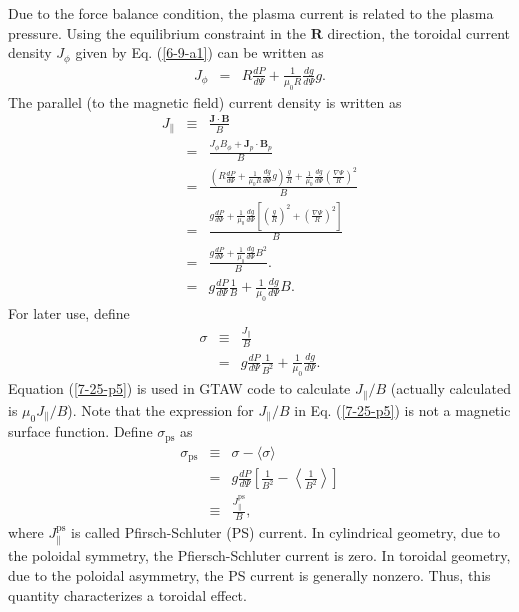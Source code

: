 \documentclass{llncs}
\newcommand{\tmop}[1]{\ensuremath{\operatorname{#1}}}
\begin{document}
Due to the force balance condition, the plasma current is related to the
plasma pressure. Using the equilibrium constraint in the $\mathbf{R}$
direction, the toroidal current density $J_{\phi}$ given by Eq. (\ref{6-9-a1})
can be written as
\begin{eqnarray}
  J_{\phi} & = & R \frac{d P}{d \Psi} + \frac{1}{\mu_0 R}  \frac{d g}{d \Psi}
  g.  \label{4-10-1}
\end{eqnarray}
The parallel (to the magnetic field) current density is written as
\begin{eqnarray}
  J_{\parallel} & \equiv & \frac{\mathbf{J} \cdot \mathbf{B}}{B} \nonumber\\
  & = & \frac{J_{\phi} B_{\phi} +\mathbf{J}_p \cdot \mathbf{B}_p}{B}
  \nonumber\\
  & = & \frac{\left( R \frac{d P}{d \Psi} + \frac{1}{\mu_0 R}  \frac{d g}{d
  \Psi} g \right) \frac{g}{R} + \frac{1}{\mu_0}  \frac{d g}{d \Psi} \left(
  \frac{\nabla \Psi}{R} \right)^2}{B} \nonumber\\
  & = & \frac{g \frac{d P}{d \Psi} + \frac{1}{\mu_0}  \frac{d g}{d \Psi}
  \left[  \left( \frac{g}{R} \right)^2 + \left( \frac{\nabla \Psi}{R}
  \right)^2 \right]}{B} \nonumber\\
  & = & \frac{g \frac{d P}{d \Psi} + \frac{1}{\mu_0}  \frac{d g}{d \Psi}
  B^2}{B} . \nonumber\\
  & = & g \frac{d P}{d \Psi}  \frac{1}{B} + \frac{1}{\mu_0}  \frac{d g}{d
  \Psi} B. 
\end{eqnarray}
For later use, define
\begin{eqnarray}
  \sigma & \equiv & \frac{J_{\parallel}}{B} \nonumber\\
  & = & g \frac{d P}{d \Psi}  \frac{1}{B^2} + \frac{1}{\mu_0}  \frac{d g}{d
  \Psi} .  \label{7-25-p5}
\end{eqnarray}
Equation (\ref{7-25-p5}) is used in GTAW code to calculate $J_{\parallel} / B$
(actually calculated is $\mu_0 J_{\parallel} / B$){\cite{hu2014}}. Note that
the expression for $J_{\parallel} / B$ in Eq. (\ref{7-25-p5}) is not a
magnetic surface function. Define $\sigma_{\tmop{ps}}$ as
\begin{eqnarray}
  \sigma_{\tmop{ps}} & \equiv & \sigma - \langle \sigma \rangle \nonumber\\
  & = & g \frac{d P}{d \Psi} \left[  \frac{1}{B^2} - \left\langle
  \frac{1}{B^2} \right\rangle \right] \\
  & \equiv & \frac{J_{\parallel}^{\tmop{ps}}}{B}, 
\end{eqnarray}
where $J_{\parallel}^{\tmop{ps}}$ is called Pfirsch-Schluter (PS) current. In
cylindrical geometry, due to the poloidal symmetry, the Pfiersch-Schluter
current is zero. In toroidal geometry, due to the poloidal asymmetry, the PS
current is generally nonzero. Thus, this quantity characterizes a toroidal
effect.
\end{document}
